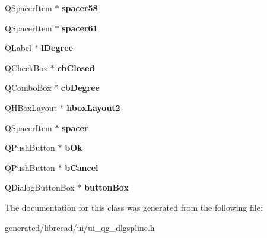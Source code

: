 \begin{DoxyCompactItemize}
\item 
\hypertarget{classUi__QG__DlgSpline_a0fba49975d60dbff27328dbe6b7421ab}{Q\-Spacer\-Item $\ast$ {\bfseries spacer58}}\label{classUi__QG__DlgSpline_a0fba49975d60dbff27328dbe6b7421ab}

\item 
\hypertarget{classUi__QG__DlgSpline_a0c4715a32120a680f2215c74a969a378}{Q\-Spacer\-Item $\ast$ {\bfseries spacer61}}\label{classUi__QG__DlgSpline_a0c4715a32120a680f2215c74a969a378}

\item 
\hypertarget{classUi__QG__DlgSpline_a160a13335f3d712949890500e747ee44}{Q\-Label $\ast$ {\bfseries l\-Degree}}\label{classUi__QG__DlgSpline_a160a13335f3d712949890500e747ee44}

\item 
\hypertarget{classUi__QG__DlgSpline_aca7724db5de7b716bcbad62fa882aece}{Q\-Check\-Box $\ast$ {\bfseries cb\-Closed}}\label{classUi__QG__DlgSpline_aca7724db5de7b716bcbad62fa882aece}

\item 
\hypertarget{classUi__QG__DlgSpline_ac3e06c078a4a0e8491afcca3f795a1b1}{Q\-Combo\-Box $\ast$ {\bfseries cb\-Degree}}\label{classUi__QG__DlgSpline_ac3e06c078a4a0e8491afcca3f795a1b1}

\item 
\hypertarget{classUi__QG__DlgSpline_aa4d50e48b73ea0dcbee0f7d8c6e84389}{Q\-H\-Box\-Layout $\ast$ {\bfseries hbox\-Layout2}}\label{classUi__QG__DlgSpline_aa4d50e48b73ea0dcbee0f7d8c6e84389}

\item 
\hypertarget{classUi__QG__DlgSpline_a8f490cacf04d1e9d12204c4cfdbb2095}{Q\-Spacer\-Item $\ast$ {\bfseries spacer}}\label{classUi__QG__DlgSpline_a8f490cacf04d1e9d12204c4cfdbb2095}

\item 
\hypertarget{classUi__QG__DlgSpline_ab2393647f8a9dd57742b1be988d0838a}{Q\-Push\-Button $\ast$ {\bfseries b\-Ok}}\label{classUi__QG__DlgSpline_ab2393647f8a9dd57742b1be988d0838a}

\item 
\hypertarget{classUi__QG__DlgSpline_a95fa47f0b74a232bcfff4d289298f90d}{Q\-Push\-Button $\ast$ {\bfseries b\-Cancel}}\label{classUi__QG__DlgSpline_a95fa47f0b74a232bcfff4d289298f90d}

\item 
\hypertarget{classUi__QG__DlgSpline_a46681cf2407663f4302d776624fb83c0}{Q\-Dialog\-Button\-Box $\ast$ {\bfseries button\-Box}}\label{classUi__QG__DlgSpline_a46681cf2407663f4302d776624fb83c0}

\end{DoxyCompactItemize}


The documentation for this class was generated from the following file\-:\begin{DoxyCompactItemize}
\item 
generated/librecad/ui/ui\-\_\-qg\-\_\-dlgspline.\-h\end{DoxyCompactItemize}
